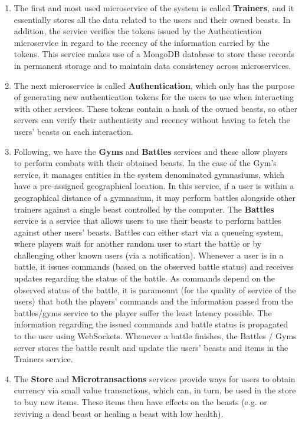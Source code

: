 \begin{enumerate}
    \item The first and most used microservice of the system is called \textbf{Trainers}, and it essentially stores all the data related to the users and their owned beasts. In addition, the service verifies the tokens issued by the Authentication microservice in regard to the recency of the information carried by the tokens. This service makes use of a MongoDB \cite{mongodb} database to store these records in permanent storage and to maintain data consistency across microservices.
    
    \item The next microservice is called \textbf{Authentication}, which only has the purpose of generating new authentication tokens for the users to use when interacting with other services. These tokens contain a hash of the owned beasts, so other servers can verify their authenticity and recency without having to fetch the users' beasts on each interaction.

    \item Following, we have the \textbf{Gyms} and \textbf{Battles} services and these allow players to perform combats with their obtained beasts. In the case of the Gym's service, it manages entities in the system denominated gymnasiums, which have a pre-assigned geographical location. In this service, if a user is within a geographical distance of a gymnasium, it may perform battles alongside other trainers against a single beast controlled by the computer. The \textbf{Battles} service is a service that allows users to use their beasts to perform battles against other users' beasts. Battles can either start via a queueing system, where players wait for another random user to start the battle or by challenging other known users (via a notification). Whenever a user is in a battle, it issues commands (based on the observed battle status) and receives updates regarding the status of the battle. As commands depend on the observed status of the battle, it is paramount (for the quality of service of the users) that both the players' commands and the information passed from the battles/gyms service to the player suffer the least latency possible. The information regarding the issued commands and battle status is propagated to the user using WebSockets. Whenever a battle finishes, the Battles / Gyms server stores the battle result and update the users' beasts and items in the Trainers service.
    
    \item The \textbf{Store} and \textbf{Microtransactions} services provide ways for users to obtain currency via small value transactions, which can, in turn, be used in the store to buy new items. These items then have effects on the beasts (e.g. or reviving a dead beast or healing a beast with low health).


\end{enumerate}
